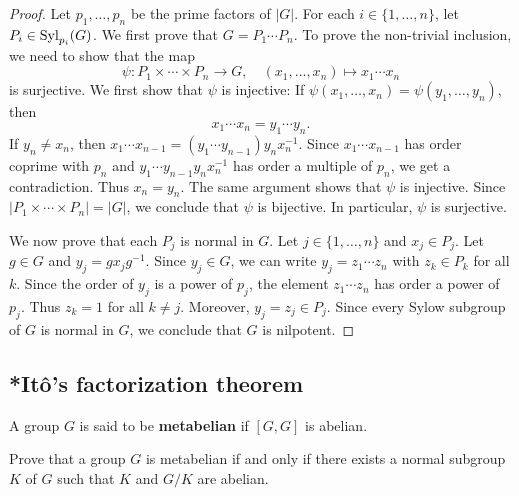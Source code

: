\begin{proof}
Let $p_1,\dots,p_n$ be the prime factors of $|G|$. For 
each 
$i\in\{1,\dots,n\}$, let $P_i\in\mathrm{Syl}_{p_i}(G)$. We first prove that 
$G=P_1\cdots P_n$. To prove the non-trivial inclusion, we need to show that 
the map
\[
	\psi\colon P_1\times\cdots\times P_n\to G,\quad
	(x_1,\dots,x_n)\mapsto x_1\cdots x_n
\]
is surjective. We first show that $\psi$ is injective: If 
$\psi(x_1,\dots,x_n)=\psi(y_1,\dots,y_n)$, then 
\[
x_1\cdots x_n=y_1\cdots y_n. 
\]
If $y_n\ne x_n$, then $x_1\cdots x_{n-1}=(y_1\cdots
y_{n-1})y_nx_n^{-1}$. Since $x_1\cdots x_{n-1}$ has order coprime with 
$p_n$ and $y_1\cdots y_{n-1}y_nx_n^{-1}$ has order a multiple of 
$p_n$, we get a contradiction. Thus  $x_n=y_n$. The same argument shows that 
$\psi$ is injective. Since $|P_1\times\cdots\times
P_n|=|G|$, we conclude that $\psi$ is bijective. In particular, 
$\psi$ is surjective. 

We now prove that each $P_j$ is normal in $G$. Let $j\in\{1,\dots,n\}$ and 
$x_j\in P_j$. Let $g\in G$ and $y_j=gx_jg^{-1}$.  Since $y_j\in G$,
we can write $y_j=z_1\cdots z_n$ with $z_k\in P_k$ for all $k$.  Since
the order of $y_j$ is a power of $p_j$, the element $z_1\cdots
z_n$ has order a power of $p_j$. Thus $z_k=1$ for all $k\ne j$. Moreover, 
$y_j=z_j\in P_j$. Since every Sylow subgroup of $G$ is normal in $G$, 
we conclude that $G$ is nilpotent. 
\end{proof}

\subsection{*It\^o's factorization theorem}

\begin{definition}
A group $G$ is said to be \textbf{metabelian} if $[G,G]$ is abelian. 
\end{definition}

\begin{exercise}
\label{xca:metabelian1}
Prove that a group $G$ is metabelian if and only if there exists a normal 
subgroup $K$ of $G$ such that $K$ and $G/K$ are abelian.
\end{exercise}


